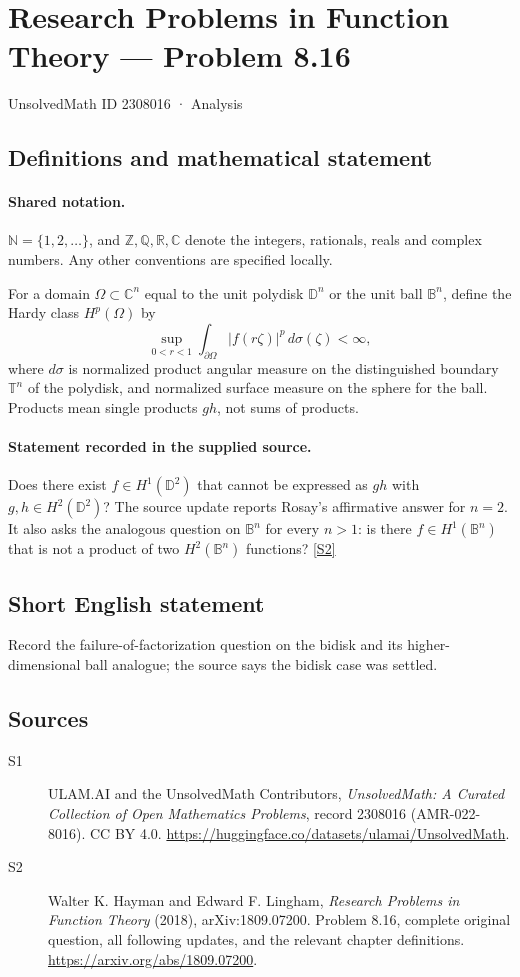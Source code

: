 \documentclass[11pt]{book}
\newcommand{\sref}[2]{\hyperlink{source:#1:#2}{[S#2]}}
\begin{document}
\setcounter{section}{2308015}
\section{Research Problems in Function Theory — Problem 8.16}\label{2308016}
{\small\sffamily UnsolvedMath ID 2308016 · Analysis}
\subsection{Definitions and mathematical statement}

\paragraph{Shared notation.}$\mathbb N=\{1,2,\ldots\}$, and $\mathbb Z,\mathbb Q,\mathbb R,\mathbb C$ denote the integers, rationals, reals and complex numbers. Any other conventions are specified locally.


For a domain $\Omega\subset\mathbb C^n$ equal to the unit polydisk $\mathbb D^n$ or the unit ball $\mathbb B^n$, define the Hardy class $H^p(\Omega)$ by \[\sup_{0<r<1}\int_{\partial\Omega}|f(r\zeta)|^p\,d\sigma(\zeta)<\infty,\] where $d\sigma$ is normalized product angular measure on the distinguished boundary $\mathbb T^n$ of the polydisk, and normalized surface measure on the sphere for the ball. Products mean single products $gh$, not sums of products.
\paragraph{Statement recorded in the supplied source.}
Does there exist $f\in H^1(\mathbb D^2)$ that cannot be expressed as $gh$ with $g,h\in H^2(\mathbb D^2)$? The source update reports Rosay’s affirmative answer for $n=2$. It also asks the analogous question on $\mathbb B^n$ for every $n>1$: is there $f\in H^1(\mathbb B^n)$ that is not a product of two $H^2(\mathbb B^n)$ functions? \sref{2308016}{2}
\subsection{Short English statement}
Record the failure-of-factorization question on the bidisk and its higher-dimensional ball analogue; the source says the bidisk case was settled.
\subsection{Sources}
\begin{description}
\item[\hypertarget{source:2308016:1}{S1}] ULAM.AI and the UnsolvedMath Contributors, \emph{UnsolvedMath: A Curated Collection of Open Mathematics Problems}, record 2308016 (AMR-022-8016). CC BY 4.0. \url{https://huggingface.co/datasets/ulamai/UnsolvedMath}.
\item[\hypertarget{source:2308016:2}{S2}] Walter K. Hayman and Edward F. Lingham, \emph{Research Problems in Function Theory} (2018), arXiv:1809.07200. Problem 8.16, complete original question, all following updates, and the relevant chapter definitions. \url{https://arxiv.org/abs/1809.07200}.
\end{description}
\label{end:2308016}
\end{document}

